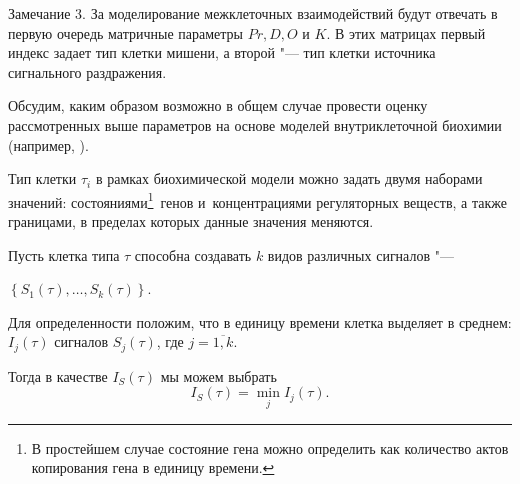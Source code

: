 %



\smallskip



{\small\sc Замечание 3.} За моделирование межклеточных взаимодействий будут отвечать в первую очередь матричные параметры $Pr, D, O$ и $K$. В этих матрицах первый индекс задает тип клетки мишени, а второй "--- тип клетки источника сигнального раздражения.



\smallskip 

 

Обсудим, каким образом возможно в общем случае провести оценку рассмотренных выше параметров на основе моделей внутриклеточной биохимии (например, \cite{Nazarov:bib:Nazarov2016}). 

 

 

 Тип клетки $ \tau_{i}$ в рамках биохимической модели можно задать двумя наборами значений: состояниями\footnote{В простейшем случае состояние гена можно определить как количество актов копирования гена в единицу времени.}\!\!~генов и~концентрациями регуляторных веществ, а также границами, в пределах которых данные значения меняются.%

 

 

 

Пусть клетка типа $\tau$ способна создавать $k$ видов различных сигналов "--- 

$\left\lbrace  S_{1}(\tau), \dots , S_{k}(\tau) \right\rbrace $. 

Для определенности положим, что в единицу времени клетка выделяет в среднем: $  I_{j}(\tau)$ сигналов $S_{j}(\tau)$, где $j = \overline{1,k}$.

Тогда в качестве $I_{S}(\tau)$ мы можем выбрать $$I_{S}(\tau) = \min_{j}I_{j}(\tau) .$$




